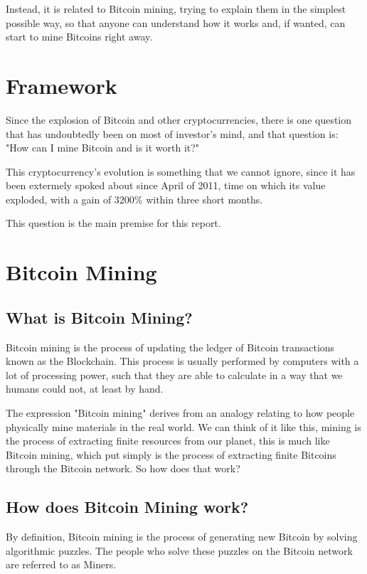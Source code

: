 \documentclass{article}
\newcommand\tab[1][1cm]{\hspace*{#1}}
\begin{document}
Instead, it is related to  Bitcoin mining, trying to explain them in the simplest possible way, so that anyone can understand how it works and, if wanted, can start to mine Bitcoins right away.

\section{Framework}

\tab Since the explosion of Bitcoin and other cryptocurrencies, there is one question that has undoubtedly been on most of investor's mind, and that question is: "How can I mine Bitcoin and is it worth it?"

This cryptocurrency's evolution is something that we cannot ignore, since it has been extermely spoked about since April of 2011, time on which its value exploded, with a gain of 3200\% within three short months.

This question is the main premise for this report.

\newpage

\section{Bitcoin Mining}
\subsection{What is Bitcoin Mining?}

\tab Bitcoin mining is the process of updating the ledger of Bitcoin transactions known as the Blockchain. This process is usually performed by computers with a lot of processing power, such that they are able to calculate in a way that we humans could not, at least by hand. 

The expression "Bitcoin mining" derives from an analogy relating to how people physically mine materials in the real world. We can think of it like this, mining is the process of extracting finite resources from our planet, this is much like Bitcoin mining, which put simply is the process of extracting finite Bitcoins through the Bitcoin network. So how does that work?

\subsection{How does Bitcoin Mining work?}

\tab By definition, Bitcoin mining is the process of generating new Bitcoin by solving algorithmic puzzles. The people who solve these puzzles on the Bitcoin network are referred to as Miners.
\end{document}
